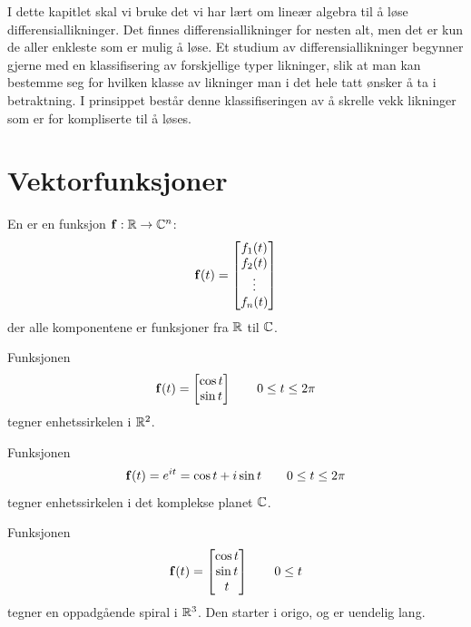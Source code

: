 

\label{ch:systemer-av-lineare-differensiallikninger}

I dette kapitlet skal vi bruke det vi har lært om lineær algebra til å løse differensiallikninger. 
Det finnes differensiallikninger for nesten alt, men det er kun de aller enkleste som er mulig å løse. 
Et studium av differensiallikninger begynner gjerne med en klassifisering av forskjellige typer likninger, 
slik at man kan bestemme seg for hvilken klasse av likninger man i det hele tatt ønsker å ta i betraktning. 
I prinsippet består denne klassifiseringen av å skrelle vekk likninger som er for kompliserte til å løses. 



\section*{Vektorfunksjoner}
En  er en funksjon $\mathbf{f}: \mathbb{R} \to \mathbb{C}^n$: 
\[
\mathbf{f}(t)=
\begin{bmatrix}
f_1(t) \\ f_2(t) \\ \vdots \\ f_n(t)
\end{bmatrix}
\]
der alle komponentene er funksjoner fra $\mathbb{R}$ til $\mathbb{C}$.

\begin{ex}
Funksjonen 
\[
\mathbf{f}(t)=
\begin{bmatrix}
\cos t \\ \sin t 
\end{bmatrix}
\qquad 0\leq t \leq 2\pi
\]
tegner enhetssirkelen i $\mathbb{R}^2$. 
\end{ex}

\begin{ex}
Funksjonen 
\[
\mathbf{f}(t)=e^{it}=\cos t + i\sin t
\qquad 0\leq t \leq 2\pi
\]
tegner enhetssirkelen i det komplekse planet $\mathbb{C}$. 
\end{ex}

\begin{ex}
Funksjonen 
\[
\mathbf{f}(t)=
\begin{bmatrix}
\cos t \\ \sin t \\ t 
\end{bmatrix}
\qquad 0\leq t 
\]
tegner en oppadgående spiral i $\mathbb{R}^3$. Den starter i origo, og er uendelig lang. 
\end{ex}


